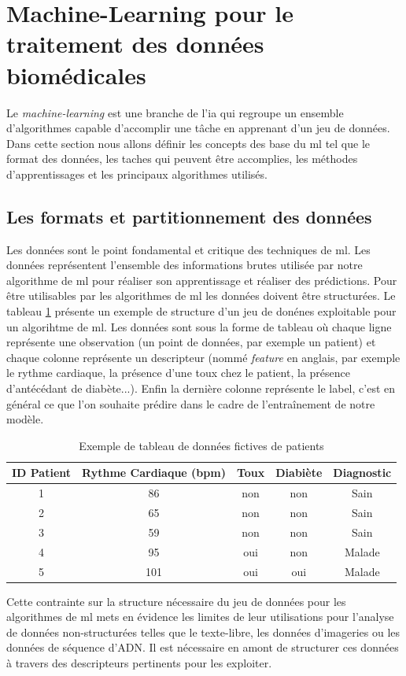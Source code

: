 \section{Machine-Learning pour le traitement des données biomédicales}
Le \textit{machine-learning} est une branche de l'\gls{ia} qui regroupe un ensemble d'algorithmes capable d'accomplir une tâche en apprenant d'un jeu de données. Dans cette section nous allons définir les concepts des base du \gls{ml} tel que le format des données, les taches qui peuvent être accomplies, les méthodes d'apprentissages et les principaux algorithmes utilisés.

\subsection{Les formats et partitionnement des données}
Les données sont le point fondamental et critique des techniques de \gls{ml}. Les données représentent l'ensemble des informations brutes utilisée par notre algorithme de \gls{ml} pour réaliser son apprentissage et réaliser des prédictions. Pour être utilisables par les algorithmes de \gls{ml} les données doivent être structurées. Le tableau \ref{table:dataset_intro} présente un exemple de structure d'un jeu de donénes exploitable pour un algorihtme de \gls{ml}. Les données sont sous la forme de tableau où chaque ligne représente une observation (un point de données, par exemple un patient) et chaque colonne représente un descripteur (nommé \textit{feature} en anglais, par exemple le rythme cardiaque, la présence d'une toux chez le patient, la présence d'antécédant de diabète...). Enfin la dernière colonne représente le label, c'est en général ce que l'on souhaite prédire dans le cadre de l'entraînement de notre modèle.
\begin{table}[h!]
\centering
\begin{tabular}{|c|c|c|c|c|} 
 \hline
 ID Patient & Rythme Cardiaque (bpm) & Toux & Diabiète & Diagnostic \\
 \hline
 1 & 86 & non & non & Sain \\ 
 2 & 65 & non & non & Sain \\ 
 3 & 59 & non & non & Sain \\ 
 4 & 95 & oui & non & Malade \\ 
 5 & 101 & oui & oui & Malade\\ 
 \hline
\end{tabular}
\caption{Exemple de tableau de données fictives de patients}
\label{table:dataset_intro}
\end{table}
Cette contrainte sur la structure nécessaire du jeu de données pour les algorithmes de \gls{ml} mets en évidence les limites de leur utilisations pour l'analyse de données non-structurées telles que le texte-libre, les données d'imageries ou les données de séquence d'ADN. Il est nécessaire en amont de structurer ces données à travers des descripteurs pertinents pour les exploiter.

